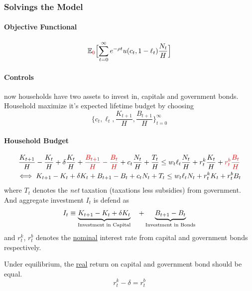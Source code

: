 \documentclass[11pt]{article}
\newcommand{\expat}[2]{\mathbb{E}_{#1}\Big[{#2}\Big]}
\begin{document}
			\subsubsection{Solvings the Model}
				\paragraph{Objective Functional}
					\begin{equation}
						\expat{\textcolor{red}{0}}{
							\sum_{t=0}^\infty e^{-\rho t} u(c_t, 1 - \ell_t) \frac{N_t}{H}
							}
					\end{equation}
				\paragraph{Controls} now households have two assets to invest in, capitals and government bonds.\\
				Household maximize it's expected lifetime budget by choosing
					\begin{equation}
						\{c_t, \ell_t, \frac{K_{t+1}}{H}, \frac{B_{t+1}}{H}\}_{t=0}^\infty
					\end{equation}
				
				\paragraph{Household Budget}
					\begin{gather}
						\frac{K_{t+1}}{H} - \frac{K_t}{H} + \delta \frac{K_t}{H} + \textcolor{red}{\frac{B_{t+1}}{H} - \frac{B_t}{H}} + c_t \frac{N_t}{H} + \frac{T_t}{H} \leq w_t \ell_t \frac{N_t}{H} + r^k_t \frac{K_t}{H} + \textcolor{red}{r^b_t \frac{B_t}{H}}\\
						\iff K_{t+1} - K_t + \delta K_t + B_{t+1} - B_t + c_t N_t + T_t \leq w_t \ell_t N_t + r^k_t K_t + r^b_t B_t
					\end{gather}
					where $T_t$ denotes the \emph{net} taxation (taxations less subsidies) from government. \\
					And aggregate investment $I_t$ is defend as
					\begin{equation}
						I_t \equiv \underbrace{
							K_{t+1} - K_t + \delta K_t}_{\text{{Investment in Capital}}}\quad + \underbrace{B_{t+1} - B_t}_{\text{{Investment in Bonds}}}
					\end{equation}
					and $r^k_t$, $r^b_t$ denotes the \ul{nominal} interest rate from capital and government bonds respectively.
					\begin{remark}
						Under equilibrium, the \ul{real} return on capital and government bond should be equal.
						\begin{equation}
							r_t^k - \delta = r_t^b
						\end{equation}
					\end{remark}
				
\end{document}
